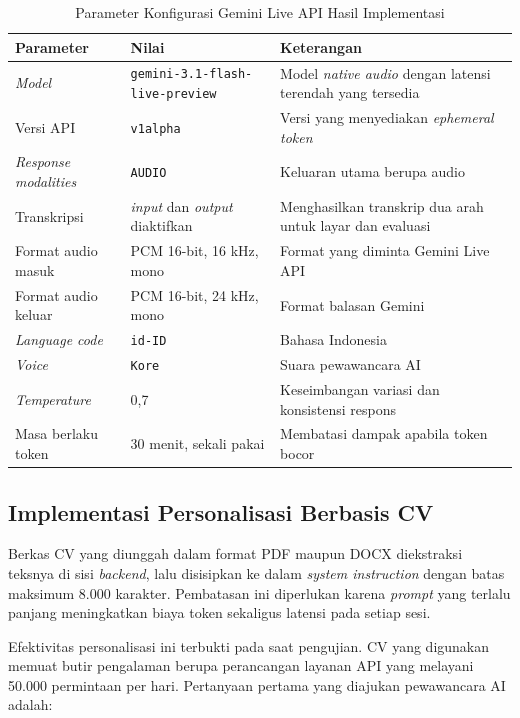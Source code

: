 \documentclass[12pt,a4paper,oneside]{report}
\begin{document}
\begin{table}[H]
\caption{Parameter Konfigurasi Gemini Live API Hasil Implementasi}
\label{tab:param-live}
\centering
\begin{tabularx}{\textwidth}{|L{3.4cm}|L{4.2cm}|X|}
\hline
\textbf{Parameter} & \textbf{Nilai} & \textbf{Keterangan} \\
\hline
\textit{Model} & \texttt{gemini-3.1-flash-}\linebreak\texttt{live-preview} & Model \textit{native audio} dengan latensi terendah yang tersedia \\
\hline
Versi API & \texttt{v1alpha} & Versi yang menyediakan \textit{ephemeral token} \\
\hline
\textit{Response modalities} & \texttt{AUDIO} & Keluaran utama berupa audio \\
\hline
Transkripsi & \textit{input} dan \textit{output} diaktifkan & Menghasilkan transkrip dua arah untuk layar dan evaluasi \\
\hline
Format audio masuk & PCM 16-bit, 16 kHz, mono & Format yang diminta Gemini Live API \\
\hline
Format audio keluar & PCM 16-bit, 24 kHz, mono & Format balasan Gemini \\
\hline
\textit{Language code} & \texttt{id-ID} & Bahasa Indonesia \\
\hline
\textit{Voice} & \texttt{Kore} & Suara pewawancara AI \\
\hline
\textit{Temperature} & 0,7 & Keseimbangan variasi dan konsistensi respons \\
\hline
Masa berlaku token & 30 menit, sekali pakai & Membatasi dampak apabila token bocor \\
\hline
\end{tabularx}
\end{table}

\subsection{Implementasi Personalisasi Berbasis CV}

Berkas CV yang diunggah dalam format PDF maupun DOCX diekstraksi teksnya di
sisi \textit{backend}, lalu disisipkan ke dalam \textit{system instruction}
dengan batas maksimum 8.000 karakter. Pembatasan ini diperlukan karena
\textit{prompt} yang terlalu panjang meningkatkan biaya token sekaligus
latensi pada setiap sesi.

Efektivitas personalisasi ini terbukti pada saat pengujian. CV yang digunakan
memuat butir pengalaman berupa perancangan layanan API yang melayani 50.000
permintaan per hari. Pertanyaan pertama yang diajukan pewawancara AI adalah:
\end{document}
